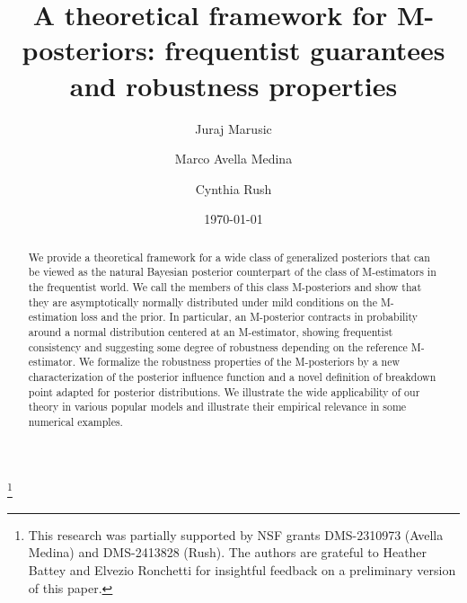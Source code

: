\documentclass[11pt, oneside]{amsart}
\theoremstyle{definition}   %
\begin{document}
\title{A theoretical framework for M-posteriors: frequentist guarantees and robustness properties} %
\author[J.\ Marusic]{Juraj Marusic}
\address{%
  Department of Statistics\\
  Columbia University\\
  New York, NY 10027, USA
}
%
\author[M. Avella Medina]{Marco Avella Medina}
\address{%
  Department of Statistics\\
  Columbia University\\
  New York, NY 10027, USA
}
%
\author[C. Rush]{Cynthia Rush}
\address{%
  Department of Statistics\\
  Columbia University\\
  New York, NY 10027, USA
}



\thanks{This research was partially
supported by  NSF grants DMS-2310973 (Avella Medina) and DMS-2413828 (Rush). The authors are grateful to Heather Battey and Elvezio Ronchetti for insightful feedback on a preliminary version of this paper. }   
 
\date{\today}


\begin{abstract}
We provide a theoretical framework for a wide class of generalized posteriors that can be viewed as the natural Bayesian posterior counterpart of the class of M-estimators in the frequentist world. We call the members of this class M-posteriors and show that they are asymptotically normally distributed under mild conditions on the M-estimation loss and the prior. In particular, an M-posterior contracts in probability around a normal distribution centered at an M-estimator, showing frequentist consistency and suggesting some degree of robustness depending on the reference M-estimator. We formalize the robustness properties of the M-posteriors by a new characterization of the posterior influence function and a novel definition of  breakdown point adapted for posterior distributions. We illustrate the wide applicability of our theory in various popular models and illustrate their empirical relevance in some numerical examples.


\end{abstract} %

\maketitle
\end{document}
